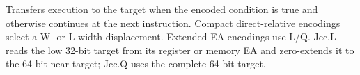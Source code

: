 Transfers execution to the target when the encoded condition is true and otherwise continues at the next instruction. Compact direct-relative encodings select a W- or L-width displacement. Extended EA encodings use L/Q. Jcc.L reads the low 32-bit target from its register or memory EA and zero-extends it to the 64-bit near target; Jcc.Q uses the complete 64-bit target.
